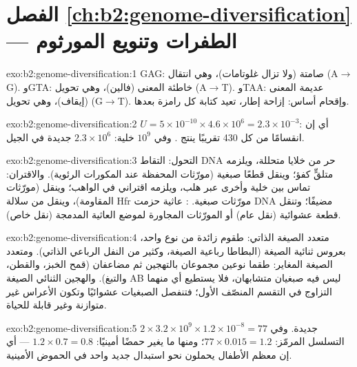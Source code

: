 \section*{الفصل \ref{ch:b2:genome-diversification} --- الطفرات وتنويع المورثوم}

\begin{solution}{exo:b2:genome-diversification:1}
GAG: صامتة (ولا تزال غلوتامات)، وهي انتقال (A$\to$G). وGTA: خاطئة
المعنى (فالين)، وهي تحويل (A$\to$T). وTAA: عديمة المعنى (إيقاف)،
وهي تحويل (G$\to$T). وإقحام أساس: إزاحة إطار، تعيد كتابة كل رامزة
بعدها.
\end{solution}

\begin{solution}{exo:b2:genome-diversification:2}
$U = 5\times 10^{-10}\times 4.6\times 10^{6} = 2.3\times 10^{-3}$: أي
إن انقسامًا من كل 430 تقريبًا ينتج . وفي $10^{9}$ خلية:
$2.3\times 10^{6}$  جديدة في الجيل.
\end{solution}

\begin{solution}{exo:b2:genome-diversification:3}
التحول: التقاط DNA حر من خلايا متحللة، ويلزمه متلقٍّ كفؤ؛ وينقل
قطعًا صبغية (مورّثات المحفظة عند المكورات الرئوية). والاقتران: تماس
بين خلية وأخرى عبر هلب، ويلزمه  اقتراني في الواهب؛ وينقل
 (مورّثات المقاومة)، وينقل من سلالة Hfr مورّثات صبغية.
: عاثية حزمت DNA مضيفًا؛ وتنقل قطعة عشوائية (نقل
عام) أو المورّثات المجاورة لموضع العاثية المدمجة (نقل خاص).
\end{solution}

\begin{solution}{exo:b2:genome-diversification:4}
متعدد الصيغة الذاتي: طقوم زائدة من نوع واحد، بعروس ثنائية الصيغة
(البطاطا رباعية الصيغة، وكثير من النفل الرباعي الذاتي). ومتعدد
الصيغة المغاير: طقما نوعين مجموعان بالتهجين ثم مضاعفان (قمح الخبز،
والقطن، والتبغ). والهجين الثنائي الصيغة AB ليس فيه صبغيان
متشابهان، فلا يستطيع أي منهما التزاوج في التقسم المنصّف الأول؛
فتنفصل الصبغيات عشوائيًا وتكون الأعراس غير متوازنة وغير قابلة للحياة.
\end{solution}

\begin{solution}{exo:b2:genome-diversification:5}
$2\times 3.2\times 10^{9}\times 1.2\times 10^{-8} = 77$  جديدة.
وفي التسلسل المرمّز: $77\times 0.015 = 1.2$؛ ومنها ما يغير حمضًا
أمينيًا: $1.2\times 0.7 = 0.8$ --- أي إن معظم الأطفال يحملون نحو
استبدال جديد واحد في الحموض الأمينية.
\end{solution}

